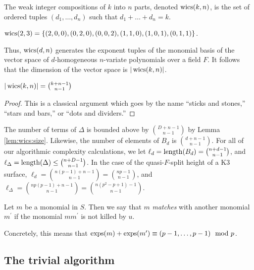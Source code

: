 \begin{defn}
    The weak integer compositions of $k$ into $n$ parts, 
    denoted $\operatorname{wics}(k, n)$, is the set of ordered tuples 
	\((d_{1}, \ldots, d_{n})\) such that 
    \(d_{1} + \ldots + d_{n} = k\).
\end{defn}

\begin{ex}
    $\operatorname{wics}(2, 3) = \lbrace (2, 0, 0), (0, 2, 0), (0, 0, 2), (1, 1, 0), (1, 0, 1), (0, 1, 1) \rbrace$.
\end{ex}

Thus, $\operatorname{wics}(d, n)$ generates the exponent tuples of the 
monomial basis of the vector space of $d$-homogeneous 
$n$-variate polynomials over a field $F$.
It follows that the dimension of the vector space is $|\operatorname{wics}(k, n)|$.

\begin{lem}
    \label{lem:wics:size}
    $|\operatorname{wics}(k, n)| = \binom{k + n - 1}{n - 1}$
\end{lem}

\begin{proof}
	This is a classical argument which goes by the 
    name ``sticks and stones,'' ``stars and bars,'' or 
    ``dots and dividers.''
\end{proof}


\begin{rmk}
    The number of terms of \(\Delta\) is bounded 
    above by \(\binom{D+n-1}{n-1}\) by Lemma \ref{lem:wics:size}.
    Likewise, the number of elements of 
    \(B_{d}\) is \(\binom{d+n-1}{n-1}\).
    For all of our algorithmic complexity calculations, 
    we let $\ell_{d} = \operatorname{length}(B_{d}) = \binom{n + d - 1}{n - 1}$, 
    and $\ell_{\Delta} = \operatorname{length}(\Delta) \leq \binom{n + D - 1}{n - 1}$.
    In the case of the quasi-\(F\)-split height of a K3 surface, 
    $\ell_{d} = \binom{n(p - 1) + n - 1}{n - 1} = \binom{np - 1}{n - 1}$, 
    and $\ell_{\Delta} = \binom{np(p - 1) + n - 1}{n - 1} = \binom{n(p^2 - p + 1) - 1}{n - 1}$.
\end{rmk}

\begin{defn}
	Let \(m\) be a monomial in \(S\). 
	Then we say that \(m\) \textit{matches}
	with another monomial \(m^{\prime}\) 
	if the monomial \(mm^{\prime}\) is
	not killed by \(u\).
\end{defn}

Concretely, this means that $\operatorname{exps}(m) + \operatorname{exps}(m^{\prime}) \equiv (p - 1, \dots, p - 1) \mod p$.

\subsection{The trivial algorithm}


